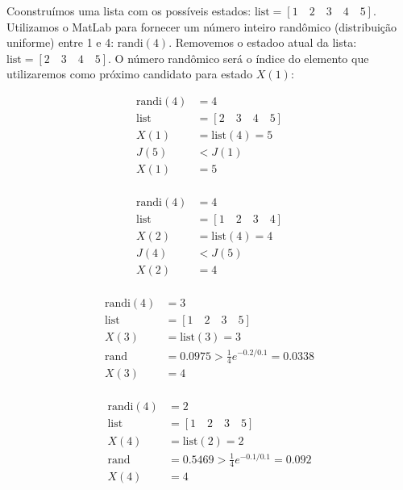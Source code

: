 \documentclass[12pt]{article}
\newenvironment{exercise}[2][Exercício]{\begin{trivlist}
\item[\hskip \labelsep {\bfseries #1}\hskip \labelsep {\bfseries #2.}]}{\end{trivlist}}
\begin{document}
\begin{exercise}{2.b}
Coonstruímos uma lista com os possíveis estados: $\text{list} = [1 \quad 2
\quad 3 \quad 4 \quad 5]$. Utilizamos o MatLab para fornecer um número inteiro
randômico (distribuição uniforme) entre 1 e 4:
$\text{randi}(4)$. Removemos o estadoo atual da lista: $\text{list} = [2
\quad 3 \quad 4 \quad 5]$. O número randômico será o índice do elemento que
utilizaremos como próximo candidato para estado $X(1)$: 

\begin{align}
\nonumber \text{randi}(4) &= 4 \\
\nonumber \text{list} &= [2
\quad 3 \quad 4 \quad 5] \\
\nonumber X(1) &= \text{list}(4) = 5 \\
\nonumber J(5) &< J(1) \\
\nonumber X(1) &= 5 \\
\end{align}

\begin{align}
\nonumber \text{randi}(4) &= 4 \\
\nonumber \text{list} &= [1
\quad 2 \quad 3 \quad 4] \\
\nonumber X(2) &= \text{list}(4) = 4 \\
\nonumber J(4) &< J(5) \\
\nonumber X(2) &= 4 \\
\end{align}

\begin{align}
\nonumber \text{randi}(4) &= 3 \\
\nonumber \text{list} &= [1
\quad 2 \quad 3 \quad 5] \\
\nonumber X(3) &= \text{list}(3) = 3 \\
\nonumber \text{rand} &= 0.0975 > \frac{1}{4}e^{-0.2/0.1} = 0.0338  \\
\nonumber X(3) &= 4 \\
\end{align}

\begin{align}
\nonumber \text{randi}(4) &= 2 \\
\nonumber \text{list} &= [1
\quad 2 \quad 3 \quad 5] \\
\nonumber X(4) &= \text{list}(2) = 2 \\
\nonumber \text{rand} &= 0.5469 > \frac{1}{4}e^{-0.1/0.1} = 0.092  \\
\nonumber X(4) &= 4 \\
\end{align}
\end{exercise}
\end{document}
